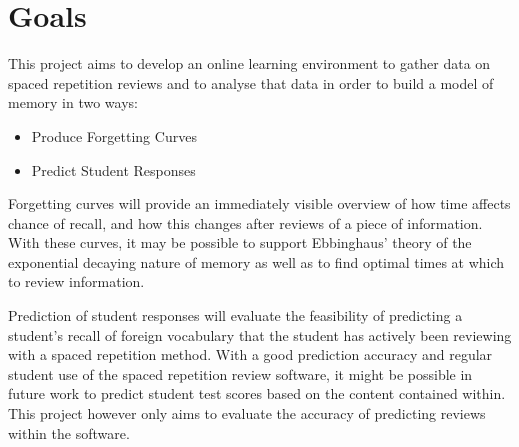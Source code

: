 \section{Goals}
\label{goals}
This project aims to develop an online learning environment to gather data on spaced repetition
reviews and to analyse that data in order to build a model of memory in two ways:
\begin{itemize}
  \item Produce Forgetting Curves
  \item Predict Student Responses
\end{itemize}

Forgetting curves will provide an immediately visible overview of how time affects chance
of recall, and how this changes after reviews of a piece of information. With these curves,
it may be possible to support Ebbinghaus' theory of the exponential decaying nature of memory
as well as to find optimal times at which to review information.

Prediction of student responses will evaluate the feasibility of predicting a student's
recall of foreign vocabulary that the student has actively been reviewing with a spaced repetition
method. With a good prediction accuracy and regular student use of the spaced repetition review
software, it might be possible in future work to predict student test scores based on
the content contained within. This project however only aims to evaluate the accuracy of
predicting reviews within the software.